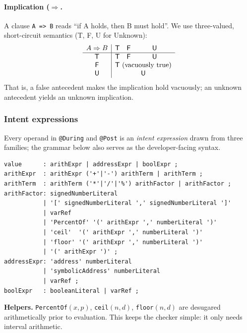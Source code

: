 \documentclass[pdflatex,sn-basic]{sn-jnl}%
\theoremstyle{thmstyleone}%
\theoremstyle{thmstyletwo}%
\theoremstyle{thmstylethree}%
\begin{document}
\paragraph{Implication (\texorpdfstring{$\Rightarrow$}).}
A clause \verb|A => B| reads “if A holds, then B must hold”.
We use three-valued, short-circuit semantics
(\textsf{T}, \textsf{F}, \textsf{U} for Unknown):
\[
\begin{array}{c|ccc}
A\Rightarrow B & \textsf{T} & \textsf{F} & \textsf{U} \\\hline
\textsf{T}      & \textsf{T} & \textsf{F} & \textsf{U}\\
\textsf{F}      & \multicolumn{3}{c}{\textsf{T} \text{ (vacuously true)}} \\
\textsf{U}      & \multicolumn{3}{c}{\textsf{U}}
\end{array}
\]
That is, a false antecedent makes the implication hold
vacuously; an unknown antecedent yields an unknown implication.

\subsubsection{Intent expressions}
\label{sec:intent-expr}
%
Every operand in \texttt{@During} and \texttt{@Post} is an
\emph{intent expression} drawn from three families; the grammar
below also serves as the developer-facing syntax.

\begin{lstlisting}[basicstyle=\scriptsize\ttfamily,frame=single]
value      : arithExpr | addressExpr | boolExpr ;
arithExpr  : arithExpr ('+'|'-') arithTerm | arithTerm ;
arithTerm  : arithTerm ('*'|'/'|'%') arithFactor | arithFactor ;
arithFactor: signedNumberLiteral
           | '[' signedNumberLiteral ',' signedNumberLiteral ']'
           | varRef
           | 'PercentOf' '(' arithExpr ',' numberLiteral ')'
           | 'ceil'  '(' arithExpr ',' numberLiteral ')'
           | 'floor' '(' arithExpr ',' numberLiteral ')'
           | '(' arithExpr ')' ;
addressExpr: 'address' numberLiteral
           | 'symbolicAddress' numberLiteral
           | varRef ;
boolExpr   : booleanLiteral | varRef ;
\end{lstlisting}

\noindent
\textbf{Helpers.}
\texttt{PercentOf$(x,p)$}, \texttt{ceil$(n,d)$}, \texttt{floor$(n,d)$}
are desugared arithmetically prior to evaluation.  This keeps the
checker simple: it only needs interval arithmetic.
\end{document}
